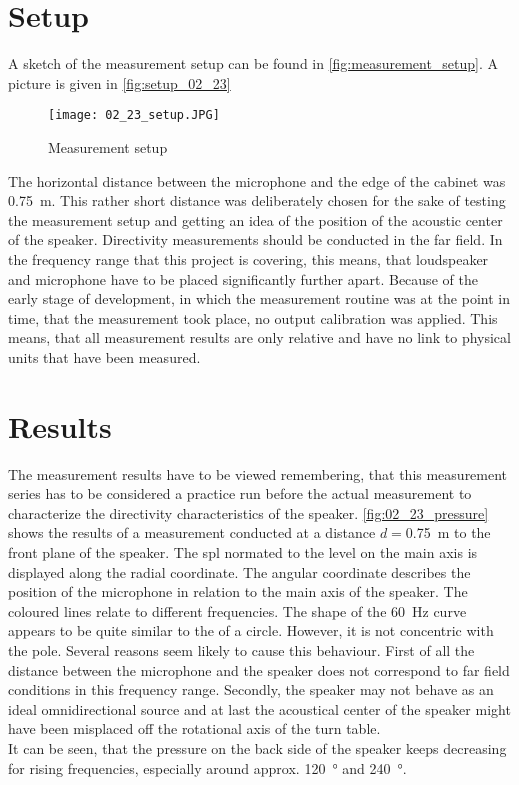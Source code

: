 \section*{Setup}
A sketch of the measurement setup can be found in \autoref{fig:measurement_setup}. A picture is given in \autoref{fig:setup_02_23}

\begin{figure}[htbp]
	\centering
	\texttt{[image: 02\_23\_setup.JPG]}
	\caption{Measurement setup}
		\label{fig:setup_02_23}
\end{figure}

The horizontal distance between the microphone and the edge of the cabinet was \SI{0.75}{\meter}. This rather short distance was deliberately chosen for the sake of testing the measurement setup and getting an idea of the position of the acoustic center of the speaker. Directivity measurements should be conducted in the far field. In the frequency range that this project is covering, this means, that loudspeaker and microphone have to be placed significantly further apart. Because of the early stage of development, in which the measurement routine was at the point in time, that the measurement took place, no output calibration was applied. This means, that all measurement results are only relative and have no link to physical units that have been measured.

\section*{Results}
The measurement results have to be viewed remembering, that this measurement series has to be considered a practice run before the actual measurement to characterize the directivity characteristics of the speaker. \autoref{fig:02_23_pressure} shows the results of a measurement conducted at a distance \(d=\)\SI{0.75}{\meter} to the front plane of the speaker. The \gls{spl} normated to the level on the main axis is displayed along the radial coordinate. The angular coordinate describes the position of the microphone in relation to the main axis of the speaker. The coloured lines relate to different frequencies.
The shape of the \SI{60}{\hertz} curve appears to be quite similar to the of a circle. However, it is not concentric with the pole. Several reasons seem likely to cause this behaviour.  First of all the distance between the microphone and the speaker does not correspond to far field conditions in this frequency range. Secondly, the speaker may not behave as an ideal omnidirectional source and at last the acoustical center of the speaker might have been misplaced off the rotational axis of the turn table.\\
It can be seen, that the pressure on the back side of the speaker keeps decreasing for rising frequencies, especially around approx. \SI{120}{\degree} and \SI{240}{\degree}.

